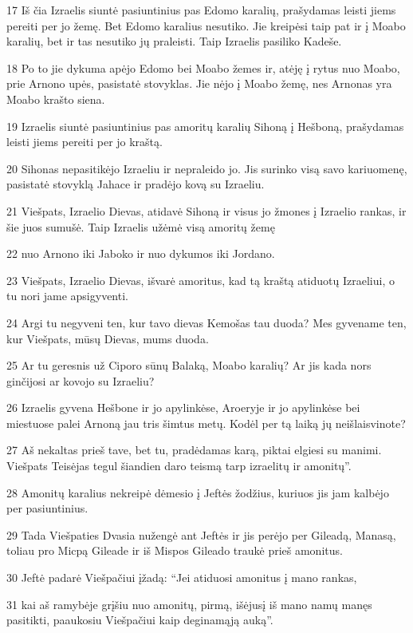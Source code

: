 \par 17 Iš čia Izraelis siuntė pasiuntinius pas Edomo karalių, prašydamas leisti jiems pereiti per jo žemę. Bet Edomo karalius nesutiko. Jie kreipėsi taip pat ir į Moabo karalių, bet ir tas nesutiko jų praleisti. Taip Izraelis pasiliko Kadeše. 
\par 18 Po to jie dykuma apėjo Edomo bei Moabo žemes ir, atėję į rytus nuo Moabo, prie Arnono upės, pasistatė stovyklas. Jie nėjo į Moabo žemę, nes Arnonas yra Moabo krašto siena. 
\par 19 Izraelis siuntė pasiuntinius pas amoritų karalių Sihoną į Hešboną, prašydamas leisti jiems pereiti per jo kraštą. 
\par 20 Sihonas nepasitikėjo Izraeliu ir nepraleido jo. Jis surinko visą savo kariuomenę, pasistatė stovyklą Jahace ir pradėjo kovą su Izraeliu. 
\par 21 Viešpats, Izraelio Dievas, atidavė Sihoną ir visus jo žmones į Izraelio rankas, ir šie juos sumušė. Taip Izraelis užėmė visą amoritų žemę 
\par 22 nuo Arnono iki Jaboko ir nuo dykumos iki Jordano. 
\par 23 Viešpats, Izraelio Dievas, išvarė amoritus, kad tą kraštą atiduotų Izraeliui, o tu nori jame apsigyventi. 
\par 24 Argi tu negyveni ten, kur tavo dievas Kemošas tau duoda? Mes gyvename ten, kur Viešpats, mūsų Dievas, mums duoda. 
\par 25 Ar tu geresnis už Ciporo sūnų Balaką, Moabo karalių? Ar jis kada nors ginčijosi ar kovojo su Izraeliu? 
\par 26 Izraelis gyvena Hešbone ir jo apylinkėse, Aroeryje ir jo apylinkėse bei miestuose palei Arnoną jau tris šimtus metų. Kodėl per tą laiką jų neišlaisvinote? 
\par 27 Aš nekaltas prieš tave, bet tu, pradėdamas karą, piktai elgiesi su manimi. Viešpats Teisėjas tegul šiandien daro teismą tarp izraelitų ir amonitų”. 
\par 28 Amonitų karalius nekreipė dėmesio į Jeftės žodžius, kuriuos jis jam kalbėjo per pasiuntinius. 
\par 29 Tada Viešpaties Dvasia nužengė ant Jeftės ir jis perėjo per Gileadą, Manasą, toliau pro Micpą Gileade ir iš Mispos Gileado traukė prieš amonitus. 
\par 30 Jeftė padarė Viešpačiui įžadą: “Jei atiduosi amonitus į mano rankas, 
\par 31 kai aš ramybėje grįšiu nuo amonitų, pirmą, išėjusį iš mano namų manęs pasitikti, paaukosiu Viešpačiui kaip deginamąją auką”. 
